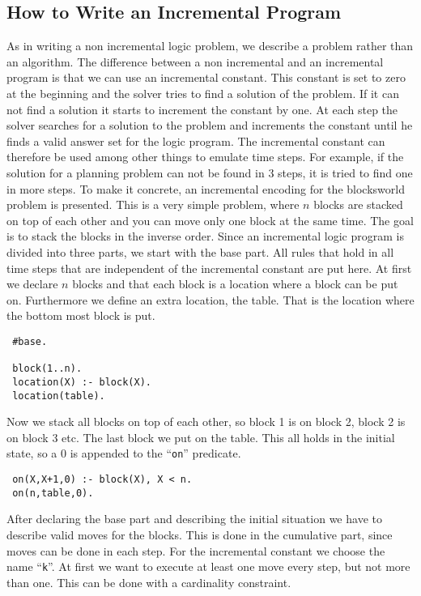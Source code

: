 \documentclass[a4paper,10pt]{article}
\begin{document}
\subsection{How to Write an Incremental Program}
As in writing a non incremental logic problem, we describe a problem rather than an algorithm.
The difference between a non incremental and an incremental program is that we can use an incremental constant.
This constant is set to zero at the beginning and the solver tries to find a solution of the problem. If it can not find a solution it starts to increment the constant by one. At each step the solver searches for a solution to the problem and increments the constant until he finds a valid answer set for the logic program.
The incremental constant can therefore be used among other things to emulate time steps.
For example, if the solution for a planning problem can not be found in 3 steps, it is tried to find one in more steps.
To make it concrete, an incremental encoding for the blocksworld problem is presented.
This is a very simple problem, where $n$ blocks are stacked on top of each other and you can move only one block at the same time. The goal is to stack the blocks in the inverse order.
Since an incremental logic program is divided into three parts, we start with the base part.
All rules that hold in all time steps that are independent of the incremental constant are put here.
At first we declare $n$ blocks and that each block is a location where a block can be put on.
Furthermore we define an extra location, the table. That is the location where the bottom most block is put.
\begin{verbatim}
 #base.

 block(1..n).
 location(X) :- block(X).
 location(table).
\end{verbatim}
Now we stack all blocks on top of each other, so block 1 is on block 2, block 2 is on block 3 etc.
The last block we put on the table.
This all holds in the initial state, so a $0$ is appended to the ``\texttt{on}'' predicate.
\begin{verbatim}
 on(X,X+1,0) :- block(X), X < n.
 on(n,table,0).
\end{verbatim}
After declaring the base part and describing the initial situation we have to describe valid moves for the blocks. This is done in the cumulative part, since moves can be done in each step. For the incremental constant we choose the name ``\texttt{k}''.
At first we want to execute at least one move every step, but not more than one. This can be done with a cardinality constraint.
\end{document}
